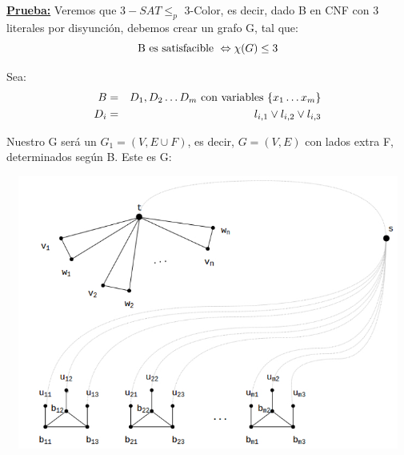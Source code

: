 \documentclass[12pt,a4paper]{report}
\begin{document}
		\textbf{\underline{Prueba:}} Veremos que $3-SAT \leq_{p}$ 3-Color, es decir, dado B en CNF con 3 literales por disyunción, debemos crear un grafo G, tal que:
			\[ \textup{B es satisfacible } \Leftrightarrow \chi(G) \leq 3 \]
			\par Sea:
				\begin{eqnarray}
					\nonumber B &=& D_{1}, D_{2} \dotsc D_{m} \textup{ con variables } \lbrace x_{1} \dotsc x_{m} \rbrace \\
					\nonumber D_{i} &=& l_{i, 1} \vee l_{i, 2} \vee l_{i, 3}
				\end{eqnarray}
			
			\par Nuestro G será un $G_{1} = (V, E \cup F)$, es decir, $G = (V, E)$ con lados extra F, determinados según B. Este es G:
			
			\begin{center}
        			\includegraphics[width=14cm, height=9cm]{./graphics/3color_npcomplete.jpg}
			\end{center}
\end{document}
